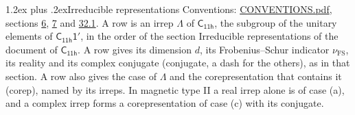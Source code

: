 \documentclass[10pt,a4paper]{article}
\makeatletter
\renewcommand\section{\@startsection{section}{1}{\z@}{-3ex plus -1ex minus -.2ex}%
  {1.2ex plus .2ex}{\normalfont\large\sffamily\bfseries\color{parttitle}}}
\numberwithin{equation}{section}
\newcommand{\grp}[1]{\mathsf{#1}}
\newcommand{\fsind}{\nu_{\mathrm{FS}}}
\makeatother
\begin{document}
\section{Irreducible representations}\label{s:irreps}
Conventions: \href{../../CONVENTIONS.pdf}{CONVENTIONS.pdf}, sections \href{../../../rotation/CONVENTIONS.pdf\#conv.6}{6}, \href{../../../rotation/CONVENTIONS.pdf\#conv.7}{7} and \href{../../CONVENTIONS.pdf\#conv.32.1}{32.1}.
\leavevmode\label{n:irrep.Delta}A row is an irrep $\Lambda$ of $\grp{C_{11h}}$, the subgroup of the unitary elements of $\grp{C_{11h}1'}$, in the order of the section Irreducible representations of the document of \href{../../../rotation/data/pdf/C11h.pdf}{$\grp{C_{11h}}$}. \label{n:index.dimension}\label{n:index.frobenius}\label{n:head.irrep}\label{n:head.reality}\label{n:head.conjugate}A row gives its dimension $d$, its Frobenius--Schur indicator $\fsind$, its reality and its complex conjugate (conjugate, a dash for the others), as in that section. \label{n:head.case.corep}\label{n:head.corep}A row also gives the case of $\Lambda$ and the corepresentation that contains it (corep), named by its irreps. In magnetic type II a real irrep alone is of case (a), and a complex irrep forms a corepresentation of case (c) with its conjugate.
\setlength{\emergencystretch}{2em}\par\setlength{\emergencystretch}{0pt}
\end{document}
